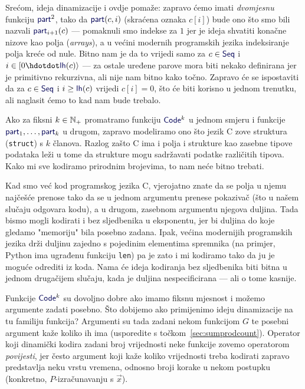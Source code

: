 Srećom, ideja dinamizacije i ovdje pomaže: zapravo ćemo imati \emph{dvomjesnu} funkciju $\f{part}^2$, tako da $\f{part}(c,i)$ (skraćena oznaka $c[i]$) bude ono što smo bili nazvali $\f{part}_{i+1}(c)$ --- pomaknuli smo indekse za $1$ jer je ideja shvatiti konačne nizove kao polja (\emph{arrays}), a u većini modernih programskih jezika indeksiranje polja kreće od nule. Bitno nam je da to vrijedi samo za $c\in\f{Seq}$ i $i\in[0\dd \f{lh}(c)\rangle$ --- za ostale uređene parove mora biti nekako definirana jer je primitivno rekurzivna, ali nije nam bitno kako točno. Zapravo će se ispostaviti da za $c\in\f{Seq}$ i $i\ge\f{lh}(c)$ vrijedi $c[i]=0$, što će biti korisno u jednom trenutku, ali naglasit ćemo to kad nam bude trebalo.

\begin{napomena}[{name=[strukture kao konačni nizovi fiksne duljine]}]
    Ako za fiksni $k\in{\mathbb N}_+$ promatramo funkciju $\f{Code}^k$ u jednom smjeru i funkcije $\f{part}_1,\dotsc,\f{part}_k$ u drugom, zapravo modeliramo ono što jezik C zove struktura (\texttt{struct}) s $k$ članova. Razlog zašto C ima i polja i strukture kao zasebne tipove podataka leži u tome da strukture mogu sadržavati podatke različitih tipova. Kako mi sve kodiramo prirodnim brojevima, to nam neće bitno trebati. %
\end{napomena}

Kad smo već kod programskog jezika C, vjerojatno znate da se polja u njemu najčešće prenose tako da se u jednom argumentu prenese pokazivač (što u našem slučaju odgovara kodu), a u drugom, zasebnom argumentu njegova duljina. Tada bismo mogli kodirati i bez sljedbenika u eksponentu, jer bi duljina do koje gledamo "memoriju" bila posebno zadana. Ipak, većina modernijih programskih jezika drži duljinu zajedno s pojedinim elementima spremnika (na primjer, Python ima ugrađenu funkciju \texttt{len}) pa je zato i mi kodiramo tako da ju je moguće odrediti iz koda. Nama će ideja kodiranja bez sljedbenika biti bitna u jednom drugačijem slučaju, kada je duljina nespecificirana --- ali o tome kasnije.

Funkcije $\f{Code}^k$ su dovoljno dobre ako imamo fiksnu mjesnost i možemo argumente zadati posebno. Što dobijemo ako primijenimo ideju dinamizacije na tu familiju funkcija? Argumenti su tada zadani nekom funkcijom $G$ te posebni argument kaže koliko ih ima (usporedite s točkom~\ref{sec:sumprodcount}). Operator koji dinamički kodira zadani broj vrijednosti neke funkcije zovemo operatorom \emph{povijesti}, jer često argument koji kaže koliko vrijednosti treba kodirati zapravo predstavlja neku vrstu vremena, odnosno broji korake u nekom postupku (konkretno, $P$-izračunavanju s $\vec x$).


